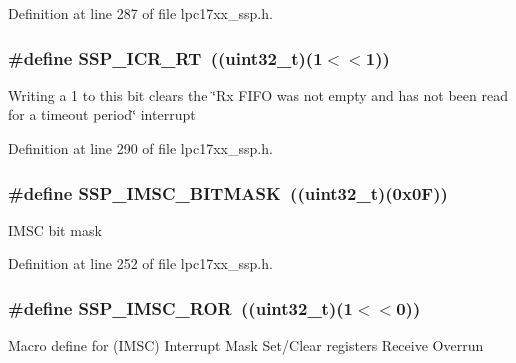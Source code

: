 \-Definition at line 287 of file lpc17xx\-\_\-ssp.\-h.

\hypertarget{group___s_s_p___private___macros_ga6917b6687bd6c914134afe3d86b10fb0}{
\subsubsection[{\-S\-S\-P\-\_\-\-I\-C\-R\-\_\-\-R\-T}]{\setlength{\rightskip}{0pt plus 5cm}\#define {\bf \-S\-S\-P\-\_\-\-I\-C\-R\-\_\-\-R\-T}~((uint32\-\_\-t)(1$<$$<$1))}}\label{group___s_s_p___private___macros_ga6917b6687bd6c914134afe3d86b10fb0}
\-Writing a 1 to this bit clears the \char`\"{}\-Rx F\-I\-F\-O was not empty and
 has not been read for a timeout period\char`\"{} interrupt 

\-Definition at line 290 of file lpc17xx\-\_\-ssp.\-h.

\hypertarget{group___s_s_p___private___macros_gaaaf58d4122c6641ca6d1e6d18c5ef7be}{
\subsubsection[{\-S\-S\-P\-\_\-\-I\-M\-S\-C\-\_\-\-B\-I\-T\-M\-A\-S\-K}]{\setlength{\rightskip}{0pt plus 5cm}\#define {\bf \-S\-S\-P\-\_\-\-I\-M\-S\-C\-\_\-\-B\-I\-T\-M\-A\-S\-K}~((uint32\-\_\-t)(0x0\-F))}}\label{group___s_s_p___private___macros_gaaaf58d4122c6641ca6d1e6d18c5ef7be}
\-I\-M\-S\-C bit mask 

\-Definition at line 252 of file lpc17xx\-\_\-ssp.\-h.

\hypertarget{group___s_s_p___private___macros_gaa004d331d2d6bf2fc123de80d6e18a95}{
\subsubsection[{\-S\-S\-P\-\_\-\-I\-M\-S\-C\-\_\-\-R\-O\-R}]{\setlength{\rightskip}{0pt plus 5cm}\#define {\bf \-S\-S\-P\-\_\-\-I\-M\-S\-C\-\_\-\-R\-O\-R}~((uint32\-\_\-t)(1$<$$<$0))}}\label{group___s_s_p___private___macros_gaa004d331d2d6bf2fc123de80d6e18a95}
\-Macro define for (\-I\-M\-S\-C) \-Interrupt \-Mask \-Set/\-Clear registers \-Receive \-Overrun 

